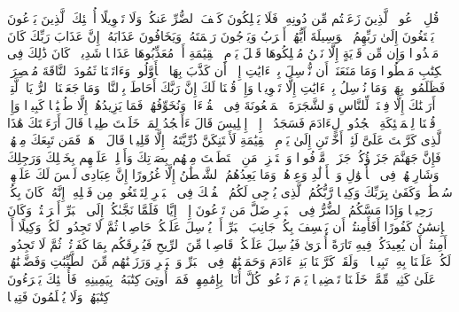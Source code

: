 \stopbuffer
\startbuffer[\q:17:56]
قُلِ ٱدۡعُوا۟ ٱلَّذِینَ زَعَمۡتُم مِّن دُونِهِۦ فَلَا یَمۡلِكُونَ كَشۡفَ ٱلضُّرِّ عَنكُمۡ وَلَا تَحۡوِیلًا%
\stopbuffer
\startbuffer[\q:17:57]
أُو۟لَٰۤئِكَ ٱلَّذِینَ یَدۡعُونَ یَبۡتَغُونَ إِلَىٰ رَبِّهِمُ ٱلۡوَسِیلَةَ أَیُّهُمۡ أَقۡرَبُ وَیَرۡجُونَ رَحۡمَتَهُۥ وَیَخَافُونَ عَذَابَهُۥۤۚ إِنَّ عَذَابَ رَبِّكَ كَانَ مَحۡذُورࣰا%
\stopbuffer
\startbuffer[\q:17:58]
وَإِن مِّن قَرۡیَةٍ إِلَّا نَحۡنُ مُهۡلِكُوهَا قَبۡلَ یَوۡمِ ٱلۡقِیَٰمَةِ أَوۡ مُعَذِّبُوهَا عَذَابࣰا شَدِیدࣰاۚ كَانَ ذَٰلِكَ فِی ٱلۡكِتَٰبِ مَسۡطُورࣰا%
\stopbuffer
\startbuffer[\q:17:59]
وَمَا مَنَعَنَاۤ أَن نُّرۡسِلَ بِٱلۡءَایَٰتِ إِلَّاۤ أَن كَذَّبَ بِهَا ٱلۡأَوَّلُونَۚ وَءَاتَیۡنَا ثَمُودَ ٱلنَّاقَةَ مُبۡصِرَةࣰ فَظَلَمُوا۟ بِهَاۚ وَمَا نُرۡسِلُ بِٱلۡءَایَٰتِ إِلَّا تَخۡوِیفࣰا%
\stopbuffer
\startbuffer[\q:17:60]
وَإِذۡ قُلۡنَا لَكَ إِنَّ رَبَّكَ أَحَاطَ بِٱلنَّاسِۚ وَمَا جَعَلۡنَا ٱلرُّءۡیَا ٱلَّتِیۤ أَرَیۡنَٰكَ إِلَّا فِتۡنَةࣰ لِّلنَّاسِ وَٱلشَّجَرَةَ ٱلۡمَلۡعُونَةَ فِی ٱلۡقُرۡءَانِۚ وَنُخَوِّفُهُمۡ فَمَا یَزِیدُهُمۡ إِلَّا طُغۡیَٰنࣰا كَبِیرࣰا%
\stopbuffer
\startbuffer[\q:17:61]
وَإِذۡ قُلۡنَا لِلۡمَلَٰۤئِكَةِ ٱسۡجُدُوا۟ لِءَادَمَ فَسَجَدُوۤا۟ إِلَّاۤ إِبۡلِیسَ قَالَ ءَأَسۡجُدُ لِمَنۡ خَلَقۡتَ طِینࣰا%
\stopbuffer
\startbuffer[\q:17:62]
قَالَ أَرَءَیۡتَكَ هَٰذَا ٱلَّذِی كَرَّمۡتَ عَلَیَّ لَئِنۡ أَخَّرۡتَنِ إِلَىٰ یَوۡمِ ٱلۡقِیَٰمَةِ لَأَحۡتَنِكَنَّ ذُرِّیَّتَهُۥۤ إِلَّا قَلِیلࣰا%
\stopbuffer
\startbuffer[\q:17:63]
قَالَ ٱذۡهَبۡ فَمَن تَبِعَكَ مِنۡهُمۡ فَإِنَّ جَهَنَّمَ جَزَاۤؤُكُمۡ جَزَاۤءࣰ مَّوۡفُورࣰا%
\stopbuffer
\startbuffer[\q:17:64]
وَٱسۡتَفۡزِزۡ مَنِ ٱسۡتَطَعۡتَ مِنۡهُم بِصَوۡتِكَ وَأَجۡلِبۡ عَلَیۡهِم بِخَیۡلِكَ وَرَجِلِكَ وَشَارِكۡهُمۡ فِی ٱلۡأَمۡوَٰلِ وَٱلۡأَوۡلَٰدِ وَعِدۡهُمۡۚ وَمَا یَعِدُهُمُ ٱلشَّیۡطَٰنُ إِلَّا غُرُورًا%
\stopbuffer
\startbuffer[\q:17:65]
إِنَّ عِبَادِی لَیۡسَ لَكَ عَلَیۡهِمۡ سُلۡطَٰنࣱۚ وَكَفَىٰ بِرَبِّكَ وَكِیلࣰا%
\stopbuffer
\startbuffer[\q:17:66]
رَّبُّكُمُ ٱلَّذِی یُزۡجِی لَكُمُ ٱلۡفُلۡكَ فِی ٱلۡبَحۡرِ لِتَبۡتَغُوا۟ مِن فَضۡلِهِۦۤۚ إِنَّهُۥ كَانَ بِكُمۡ رَحِیمࣰا%
\stopbuffer
\startbuffer[\q:17:67]
وَإِذَا مَسَّكُمُ ٱلضُّرُّ فِی ٱلۡبَحۡرِ ضَلَّ مَن تَدۡعُونَ إِلَّاۤ إِیَّاهُۖ فَلَمَّا نَجَّىٰكُمۡ إِلَى ٱلۡبَرِّ أَعۡرَضۡتُمۡۚ وَكَانَ ٱلۡإِنسَٰنُ كَفُورًا%
\stopbuffer
\startbuffer[\q:17:68]
أَفَأَمِنتُمۡ أَن یَخۡسِفَ بِكُمۡ جَانِبَ ٱلۡبَرِّ أَوۡ یُرۡسِلَ عَلَیۡكُمۡ حَاصِبࣰا ثُمَّ لَا تَجِدُوا۟ لَكُمۡ وَكِیلًا%
\stopbuffer
\startbuffer[\q:17:69]
أَمۡ أَمِنتُمۡ أَن یُعِیدَكُمۡ فِیهِ تَارَةً أُخۡرَىٰ فَیُرۡسِلَ عَلَیۡكُمۡ قَاصِفࣰا مِّنَ ٱلرِّیحِ فَیُغۡرِقَكُم بِمَا كَفَرۡتُمۡ ثُمَّ لَا تَجِدُوا۟ لَكُمۡ عَلَیۡنَا بِهِۦ تَبِیعࣰا%
\stopbuffer
\startbuffer[\q:17:70]
۞ وَلَقَدۡ كَرَّمۡنَا بَنِیۤ ءَادَمَ وَحَمَلۡنَٰهُمۡ فِی ٱلۡبَرِّ وَٱلۡبَحۡرِ وَرَزَقۡنَٰهُم مِّنَ ٱلطَّیِّبَٰتِ وَفَضَّلۡنَٰهُمۡ عَلَىٰ كَثِیرࣲ مِّمَّنۡ خَلَقۡنَا تَفۡضِیلࣰا%
\stopbuffer
\startbuffer[\q:17:71]
یَوۡمَ نَدۡعُوا۟ كُلَّ أُنَاسِۭ بِإِمَٰمِهِمۡۖ فَمَنۡ أُوتِیَ كِتَٰبَهُۥ بِیَمِینِهِۦ فَأُو۟لَٰۤئِكَ یَقۡرَءُونَ كِتَٰبَهُمۡ وَلَا یُظۡلَمُونَ فَتِیلࣰا%
\stopbuffer
